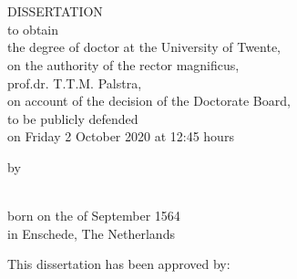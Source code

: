 \begin{titlepage}
    \ifprintcover
        \thispagestyle{empty}
        
        \cleardoublepage  
    \fi
    \pagecolor{crosstwin-blue}
    \thispagestyle{empty}
    \center
    \vspace*{1cm}

    \color{tudelft-black}
    \textbf{\Huge{\MakeUppercase\myTitle}}\\
    \vspace{0.5cm}
    \Large{\MakeUppercase\mySubTitle}

    \vspace{3cm}

    \textbf{\myAuthorName}
    \vfill
    
    \cleardoublepage
    
   
    \thispagestyle{empty}
    \center

    \pagecolor{white}
    \textbf{\huge{\MakeUppercase\myTitle}}\\
    \vspace{0.5cm}
    \Large{\MakeUppercase\mySubTitle}
        
    \vfill

    \Large{DISSERTATION}\\
   
    \vfill
    \normalsize
    to obtain\\
    the degree of doctor at the University of Twente,\\
    on the authority of the rector magnificus,\\
    prof.dr. T.T.M. Palstra,\\
    on account of the decision of the Doctorate Board,\\
    to be publicly defended\\
    on Friday 2 October 2020 at 12:45 hours

    \vfill

    by
    
    \vfill
    
    \textbf{\large{\myAuthorName}}\\[2\baselineskip]
    
    born on the  of September 1564\\
    in Enschede, The Netherlands


    \clearpage
    \thispagestyle{empty}
    \raggedright 
    
    This dissertation has been approved by:\\[2\baselineskip]
    

\end{titlepage}
